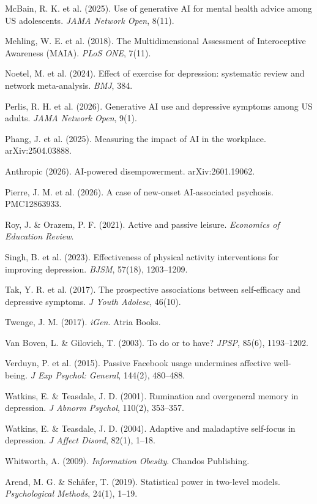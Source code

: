 \documentclass[a4paper,11pt,titlepage]{article}
\begin{document}
\begin{small}
\begin{enumerate}[label={[\arabic*]}, leftmargin=2em, itemsep=2pt]
  \item McBain, R. K. et al. (2025). Use of generative AI for mental health advice among US adolescents. \textit{JAMA Network Open}, 8(11).
  \item Mehling, W. E. et al. (2018). The Multidimensional Assessment of Interoceptive Awareness (MAIA). \textit{PLoS ONE}, 7(11).
  \item Noetel, M. et al. (2024). Effect of exercise for depression: systematic review and network meta-analysis. \textit{BMJ}, 384.
  \item Perlis, R. H. et al. (2026). Generative AI use and depressive symptoms among US adults. \textit{JAMA Network Open}, 9(1).
  \item Phang, J. et al. (2025). Measuring the impact of AI in the workplace. arXiv:2504.03888.
  \item Anthropic (2026). AI-powered disempowerment. arXiv:2601.19062.
  \item Pierre, J. M. et al. (2026). A case of new-onset AI-associated psychosis. PMC12863933.
  \item Roy, J. \& Orazem, P. F. (2021). Active and passive leisure. \textit{Economics of Education Review}.
  \item Singh, B. et al. (2023). Effectiveness of physical activity interventions for improving depression. \textit{BJSM}, 57(18), 1203--1209.
  \item Tak, Y. R. et al. (2017). The prospective associations between self-efficacy and depressive symptoms. \textit{J Youth Adolesc}, 46(10).
  \item Twenge, J. M. (2017). \textit{iGen}. Atria Books.
  \item Van Boven, L. \& Gilovich, T. (2003). To do or to have? \textit{JPSP}, 85(6), 1193--1202.
  \item Verduyn, P. et al. (2015). Passive Facebook usage undermines affective well-being. \textit{J Exp Psychol: General}, 144(2), 480--488.
  \item Watkins, E. \& Teasdale, J. D. (2001). Rumination and overgeneral memory in depression. \textit{J Abnorm Psychol}, 110(2), 353--357.
  \item Watkins, E. \& Teasdale, J. D. (2004). Adaptive and maladaptive self-focus in depression. \textit{J Affect Disord}, 82(1), 1--18.
  \item Whitworth, A. (2009). \textit{Information Obesity}. Chandos Publishing.
  \item Arend, M. G. \& Schäfer, T. (2019). Statistical power in two-level models. \textit{Psychological Methods}, 24(1), 1--19.

\end{enumerate}
\end{small}
\end{document}
